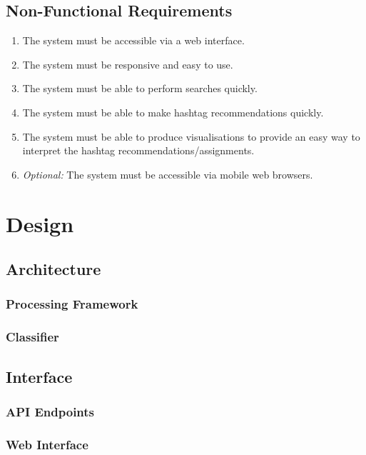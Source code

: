 \documentclass[11pt,a4paper]{report}
\begin{document}
\section{Non-Functional Requirements}
\begin{enumerate}
    \item \label{nfunc:web} The system must be accessible via a web interface.
    \item \label{nfunc:easy} The system must be responsive and easy to use.
    \item \label{nfunc:qsearch} The system must be able to perform searches quickly.
    \item \label{nfunc:qsuggest} The system must be able to make hashtag recommendations quickly.
    \item \label{nfunc:graphs} The system must be able to produce visualisations to provide an easy way to interpret the hashtag recommendations/assignments.
    \item \label{nfunc:mobile} \emph{Optional:} The system must be accessible via mobile web browsers.
\end{enumerate}

\pagebreak

\chapter{Design}
    \section{Architecture}
        \subsection{Processing Framework}
        \subsection{Classifier}
    \section{Interface}
        \subsection{API Endpoints}
        \subsection{Web Interface}
\end{document}
